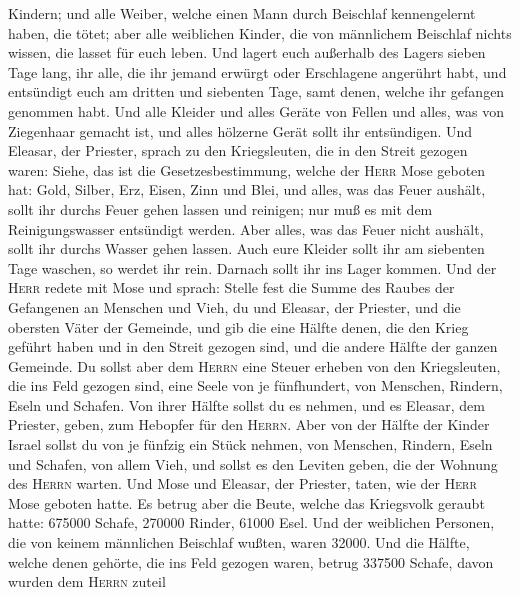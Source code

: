 Kindern; und alle Weiber, welche einen Mann durch Beischlaf
kennengelernt haben, die tötet;  aber alle weiblichen
Kinder, die von männlichem Beischlaf nichts wissen, die lasset für euch
leben.  Und lagert euch außerhalb des Lagers sieben Tage
lang, ihr alle, die ihr jemand erwürgt oder Erschlagene angerührt habt,
und entsündigt euch am dritten und siebenten Tage, samt denen, welche
ihr gefangen genommen habt.  Und alle Kleider und alles
Geräte von Fellen und alles, was von Ziegenhaar gemacht ist, und alles
hölzerne Gerät sollt ihr entsündigen.  Und Eleasar, der
Priester, sprach zu den Kriegsleuten, die in den Streit gezogen waren:
Siehe, das ist die Gesetzesbestimmung, welche der \textsc{Herr} Mose
geboten hat:  Gold, Silber, Erz, Eisen, Zinn und Blei,
und alles,  was das Feuer aushält, sollt ihr durchs Feuer
gehen lassen und reinigen; nur muß es mit dem Reinigungswasser
entsündigt werden. Aber alles, was das Feuer nicht aushält, sollt ihr
durchs Wasser gehen lassen.  Auch eure Kleider sollt ihr
am siebenten Tage waschen, so werdet ihr rein. Darnach sollt ihr ins
Lager kommen.  Und der \textsc{Herr} redete mit Mose und
sprach:  Stelle fest die Summe des Raubes der Gefangenen
an Menschen und Vieh, du und Eleasar, der Priester, und die obersten
Väter der Gemeinde, und gib die eine Hälfte denen,  die
den Krieg geführt haben und in den Streit gezogen sind, und die andere
Hälfte der ganzen Gemeinde.  Du sollst aber dem
\textsc{Herrn} eine Steuer erheben von den Kriegsleuten, die ins Feld
gezogen sind, eine Seele von je fünfhundert, von Menschen, Rindern,
Eseln und Schafen.  Von ihrer Hälfte sollst du es nehmen,
und es Eleasar, dem Priester, geben, zum Hebopfer für den
\textsc{Herrn}.  Aber von der Hälfte der Kinder Israel
sollst du von je fünfzig ein Stück nehmen, von Menschen, Rindern, Eseln
und Schafen, von allem Vieh, und sollst es den Leviten geben, die der
Wohnung des \textsc{Herrn} warten.  Und Mose und Eleasar,
der Priester, taten, wie der \textsc{Herr} Mose geboten hatte.
 Es betrug aber die Beute, welche das Kriegsvolk geraubt
hatte: 675000 Schafe, 270000 Rinder,  61000 Esel.
 Und der weiblichen Personen,  die von
keinem männlichen Beischlaf wußten, waren 32000.  Und die
Hälfte, welche denen gehörte, die ins Feld gezogen waren, betrug 337500
Schafe,  davon wurden dem \textsc{Herrn} zuteil
